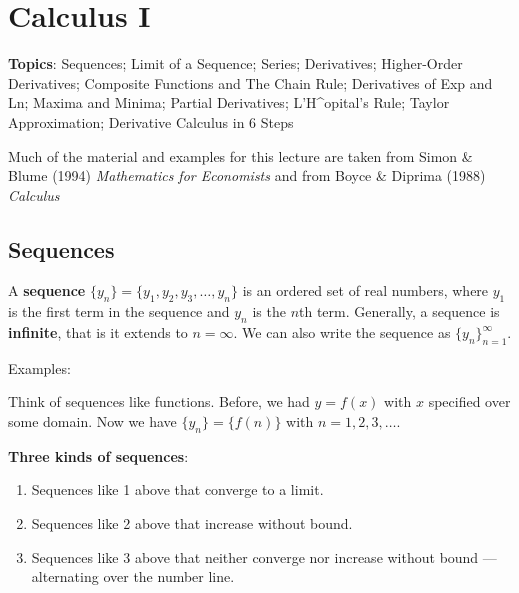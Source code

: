 \documentclass[]{book}
\providecommand{\tightlist}{%
  \setlength{\itemsep}{0pt}\setlength{\parskip}{0pt}}
\theoremstyle{definition}
\theoremstyle{definition}
\theoremstyle{definition}
\theoremstyle{remark}
\begin{document}
\chapter{Calculus I}\label{calculus-i}

\textbf{Topics}: Sequences; Limit of a Sequence; Series; Derivatives;
Higher-Order Derivatives; Composite Functions and The Chain Rule;
Derivatives of Exp and Ln; Maxima and Minima; Partial Derivatives;
L'H\^{}opital's Rule; Taylor Approximation; Derivative Calculus in 6
Steps

Much of the material and examples for this lecture are taken from Simon
\& Blume (1994) \emph{Mathematics for Economists} and from Boyce \&
Diprima (1988) \emph{Calculus}

\section{Sequences}\label{sequences}

A \textbf{sequence} \(\{y_n\}=\{y_1, y_2, y_3, \ldots, y_n\}\) is an
ordered set of real numbers, where \(y_1\) is the first term in the
sequence and \(y_n\) is the \(n\)th term. Generally, a sequence is
\textbf{infinite}, that is it extends to \(n=\infty\). We can also write
the sequence as \(\{y_n\}^\infty_{n=1}\).

Examples:

\begin{comment}
    \begin{enumerate}
        \item \parbox[t]{3in}{$\{y_n\}=\left\{ 2-\frac{1}{n^2} \right\} = $}\parbox[t]{1in}{\, {\texttt{[image: limit.eps]}}}
        \item \parbox[t]{3in}{$\{y_n\}=\left\{ \frac{n^2+1}{n} \right\} = $}\parbox[t]{1in}{\,  {\texttt{[image: unbound.eps]}}}
        \item \parbox[t]{3in}{$\{y_n\}=\left\{ (-1)^n \left(1-\frac{1}{n}\right) \right\} = $}\parbox[t]{1in}{\,  {\texttt{[image: altrnate.eps]}}}
    \end{enumerate}
\end{comment}

Think of sequences like functions. Before, we had \(y=f(x)\) with \(x\)
specified over some domain. Now we have \(\{y_n\}=\{f(n)\}\) with
\(n=1,2,3,\ldots\).

\textbf{Three kinds of sequences}:

\begin{enumerate}
\def\labelenumi{\arabic{enumi}.}
\tightlist
\item
  Sequences like 1 above that converge to a limit.
\item
  Sequences like 2 above that increase without bound.
\item
  Sequences like 3 above that neither converge nor increase without
  bound --- alternating over the number line.
\end{enumerate}
\end{document}

